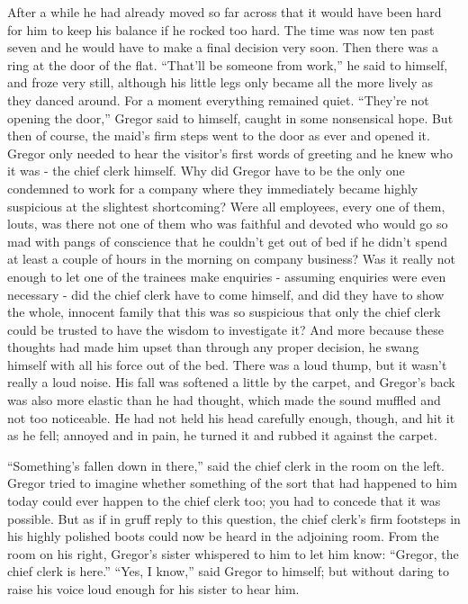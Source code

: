 \documentclass[12pt]{report}
\begin{document}
After a while he had already moved so far across that it would have been
hard for him to keep his balance if he rocked too hard. The time was now
ten past seven and he would have to make a final decision very soon.
Then there was a ring at the door of the flat. ``That'll be someone from
work,'' he said to himself, and froze very still, although his little
legs only became all the more lively as they danced around. For a moment
everything remained quiet. ``They're not opening the door,'' Gregor said
to himself, caught in some nonsensical hope. But then of course, the
maid's firm steps went to the door as ever and opened it. Gregor only
needed to hear the visitor's first words of greeting and he knew who it
was - the chief clerk himself. Why did Gregor have to be the only one
condemned to work for a company where they immediately became highly
suspicious at the slightest shortcoming? Were all employees, every one
of them, louts, was there not one of them who was faithful and devoted
who would go so mad with pangs of conscience that he couldn't get out of
bed if he didn't spend at least a couple of hours in the morning on
company business? Was it really not enough to let one of the trainees
make enquiries - assuming enquiries were even necessary - did the chief
clerk have to come himself, and did they have to show the whole,
innocent family that this was so suspicious that only the chief clerk
could be trusted to have the wisdom to investigate it? And more because
these thoughts had made him upset than through any proper decision, he
swang himself with all his force out of the bed. There was a loud thump,
but it wasn't really a loud noise. His fall was softened a little by the
carpet, and Gregor's back was also more elastic than he had thought,
which made the sound muffled and not too noticeable. He had not held his
head carefully enough, though, and hit it as he fell; annoyed and in
pain, he turned it and rubbed it against the carpet.

``Something's fallen down in there,'' said the chief clerk in the room
on the left. Gregor tried to imagine whether something of the sort that
had happened to him today could ever happen to the chief clerk too; you
had to concede that it was possible. But as if in gruff reply to this
question, the chief clerk's firm footsteps in his highly polished boots
could now be heard in the adjoining room. From the room on his right,
Gregor's sister whispered to him to let him know: ``Gregor, the chief
clerk is here.'' ``Yes, I know,'' said Gregor to himself; but without
daring to raise his voice loud enough for his sister to hear him.
\end{document}

